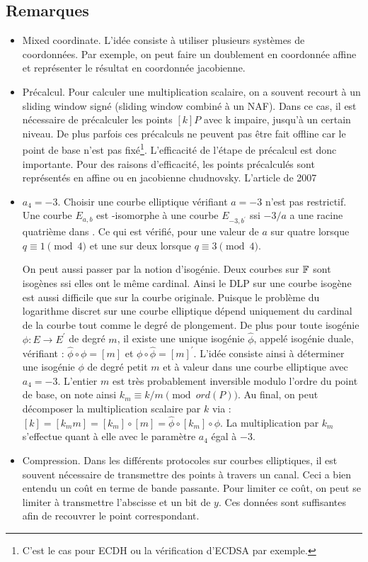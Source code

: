 \subsection{Remarques}
\begin{itemize}[label=$\bullet$]
    \item Mixed coordinate. L'idée consiste à utiliser plusieurs systèmes de coordonnées. Par exemple, on peut faire un doublement en coordonnée affine et représenter le résultat en coordonnée jacobienne.
    \item Précalcul. Pour calculer une multiplication scalaire, on a souvent recourt à un sliding window signé (sliding window combiné à un NAF). Dans ce cas, il est nécessaire de précalculer les points $[k]P$ avec k impaire, jusqu'à un certain niveau. De plus parfois ces précalculs ne peuvent pas être fait offline car le point de base n'est pas fixé\footnote{C'est le cas pour ECDH ou la vérification d'ECDSA par exemple.}. L'efficacité de l'étape de précalcul est donc importante. Pour des raisons d'efficacité, les points précalculés sont représentés en affine ou en jacobienne chudnovsky. L'article de 2007 \href{}{}
    \item $a_4 = -3$. Choisir une courbe elliptique vérifiant $a = -3$ n'est pas restrictif. Une courbe $E_{a, b}$ est -isomorphe à une courbe $E_{-3, b^{'}}$ ssi $-3/a$ a une racine quatrième dans . Ce qui est vérifié, pour une valeur de $a$ sur quatre lorsque $q \equiv 1 \pmod 4$ et une sur deux lorsque $q \equiv 3 \pmod 4$.

On peut aussi passer par la notion d'isogénie. Deux courbes sur $\mathbb{F}_{}$ sont isogènes ssi elles ont le même cardinal. Ainsi le DLP sur une courbe isogène est aussi difficile que sur la courbe originale. Puisque le problème du logarithme discret sur une courbe elliptique dépend uniquement du cardinal de la courbe tout comme le degré de plongement. De plus pour toute isogénie $\phi : E \to E^{'}$ de degré $m$, il existe une unique isogénie $\hat{\phi}$, appelé isogénie duale, vérifiant : $\hat{\phi} \circ \phi = [m]$ et $\phi \circ \hat{\phi} = [m]^{'}$. L'idée consiste ainsi à déterminer une  isogénie $\phi$ de degré petit $m$ et à valeur dans une courbe elliptique avec $a_4 = -3$. L'entier $m$ est très probablement inversible modulo l'ordre du point de base, on note ainsi $k_m \equiv k/m \pmod{ord(P)}$. Au final, on peut décomposer la multiplication scalaire par $k$ via : $[k] = [k_m m] = [k_m] \circ [m] = \hat{\phi} \circ [k_m] \circ \phi$. La multiplication par $k_m$ s'effectue quant à elle avec le paramètre $a_4$ égal à $-3$. 
    \item Compression. Dans les différents protocoles sur courbes elliptiques, il est souvent nécessaire de transmettre des points à travers un canal. Ceci a bien entendu un coût en terme de bande passante. Pour limiter ce coût, on peut se limiter à transmettre l'abscisse et un bit de $y$. Ces données sont suffisantes afin de recouvrer le point correspondant. 
\end{itemize}



